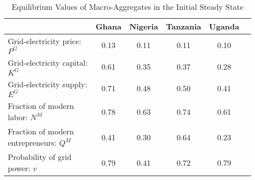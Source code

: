\begin{table}[H] 
\center 
\singlespace 
\caption{Equilibrium Values of Macro-Aggregates in the Initial Steady State} \label{agg_initial}
\vspace{-.1in} 
\begin{tabular}{l c c c c c}\hline 
  & Ghana & Nigeria & Tanzania & Uganda    \\ 
\hline 
Grid-electricity price: $P^G$ &     0.13 &     0.11 &     0.11  &     0.10   \\  Grid-electricity capital: $K^G$ &     0.61 &     0.35 &     0.37  &     0.28     \\  Grid-electricity supply: $E^G$ &     0.71 &     0.48 &     0.50  &     0.41     \\ Fraction of modern labor: $N^M$ &     0.78 &     0.63 &     0.74  &     0.61     \\  Fraction of modern entrepreneurs: $Q^M$ &     0.41 &     0.30 &     0.64  &     0.23     \\  Probability of grid power: $v$ &     0.79 &     0.41 &     0.72  &     0.79     \\ \hline 
\end{tabular}
\end{table} 
